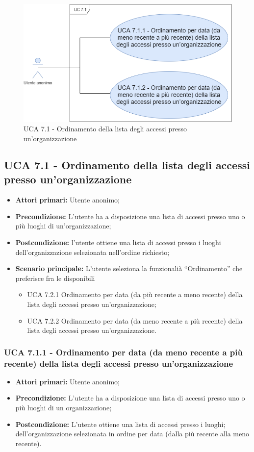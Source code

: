 \begin{figure}[h]
	\centering
	\caption{UCA 7.1 - Ordinamento della lista degli accessi presso un’organizzazione}
	\includegraphics[scale=0.5]{sezioni/UseCase/Immagini/UCA7.1.png}
\end{figure}
\subsection{UCA 7.1 - Ordinamento della lista degli accessi presso un’organizzazione}%
\begin{itemize}
\item \textbf{Attori primari:} Utente anonimo;
\item \textbf{Precondizione:} L’utente ha a disposizione una lista di accessi presso uno o più luoghi di un'organizzazione;
\item \textbf{Postcondizione:} l’utente ottiene una lista di accessi presso i luoghi dell’organizzazione selezionata nell’ordine richiesto;
\item \textbf{Scenario principale:} L’utente seleziona la funzionalià “Ordinamento” che preferisce fra le disponibili
	\begin{itemize}
	\item UCA 7.2.1 Ordinamento per data (da più recente a meno recente) della lista degli accessi presso un’organizzazione;
	\item UCA 7.2.2 Ordinamento per data (da meno recente a più recente) della lista degli accessi presso un’organizzazione.
	\end{itemize}
\end{itemize}

\subsubsection{UCA 7.1.1 - Ordinamento per data (da meno recente a più recente) della lista degli accessi presso un’organizzazione}%
\begin{itemize}
\item \textbf{Attori primari:} Utente anonimo;
\item \textbf{Precondizione:} L’utente ha a disposizione una lista di accessi presso uno o più luoghi di un organizzazione;
\item \textbf{Postcondizione:} L’utente ottiene una lista di accessi presso i luoghi; dell’organizzazione selezionata in ordine per data (dalla più recente alla meno recente).
\end{itemize}

